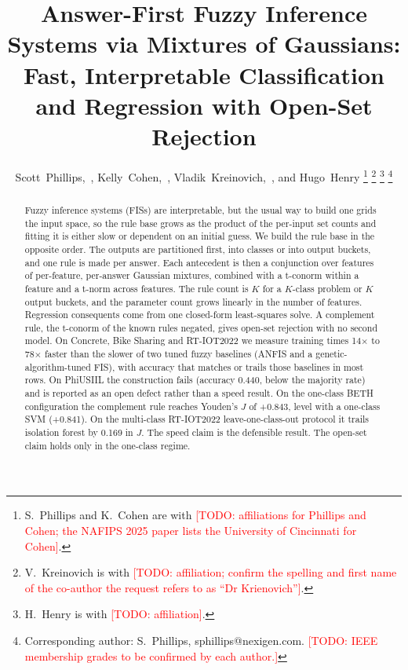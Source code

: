 \documentclass[journal]{IEEEtran}
\newcommand{\todo}[1]{\textcolor{red}{[TODO: #1]}}
\begin{document}
\title{Answer-First Fuzzy Inference Systems via Mixtures of Gaussians:\\Fast, Interpretable Classification and Regression with Open-Set Rejection}

\author{Scott~Phillips,~,
Kelly~Cohen,~,
Vladik~Kreinovich,~, and
Hugo~Henry%
\thanks{S.~Phillips and K.~Cohen are with \todo{affiliations for Phillips and Cohen; the NAFIPS 2025 paper lists the University of Cincinnati for Cohen}.}%
\thanks{V.~Kreinovich is with \todo{affiliation; confirm the spelling and first name of the co-author the request refers to as ``Dr Krienovich''}.}%
\thanks{H.~Henry is with \todo{affiliation}.}%
\thanks{Corresponding author: S.~Phillips, sphillips@nexigen.com. \todo{IEEE membership grades to be confirmed by each author.}}}


\maketitle

\begin{abstract}
Fuzzy inference systems (FISs) are interpretable, but the usual way to build one grids the input space, so the rule base grows as the product of the per-input set counts and fitting it is either slow or dependent on an initial guess. We build the rule base in the opposite order. The outputs are partitioned first, into classes or into output buckets, and one rule is made per answer. Each antecedent is then a conjunction over features of per-feature, per-answer Gaussian mixtures, combined with a t-conorm within a feature and a t-norm across features. The rule count is $K$ for a $K$-class problem or $K$ output buckets, and the parameter count grows linearly in the number of features. Regression consequents come from one closed-form least-squares solve. A complement rule, the t-conorm of the known rules negated, gives open-set rejection with no second model. On Concrete, Bike Sharing and RT-IOT2022 we measure training times 14$\times$ to 78$\times$ faster than the slower of two tuned fuzzy baselines (ANFIS and a genetic-algorithm-tuned FIS), with accuracy that matches or trails those baselines in most rows. On PhiUSIIL the construction fails (accuracy 0.440, below the majority rate) and is reported as an open defect rather than a speed result. On the one-class BETH configuration the complement rule reaches Youden's $J$ of +0.843, level with a one-class SVM (+0.841). On the multi-class RT-IOT2022 leave-one-class-out protocol it trails isolation forest by 0.169 in $J$. The speed claim is the defensible result. The open-set claim holds only in the one-class regime.
\end{abstract}
\end{document}
